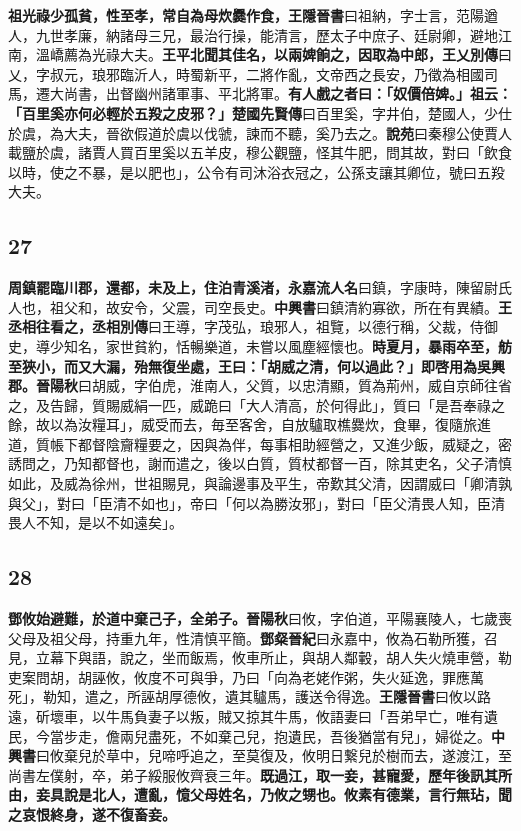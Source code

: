 \textbf{祖光祿少孤貧，性至孝，常自為母炊爨作食，}{\footnotesize \textbf{王隱晉書}曰祖納，字士言，范陽遒人，九世孝廉，納諸母三兄，最治行操，能清言，歷太子中庶子、廷尉卿，避地江南，溫嶠薦為光祿大夫。}\textbf{王平北聞其佳名，以兩婢餉之，因取為中郎，}{\footnotesize \textbf{王乂別傳}曰乂，字叔元，琅邪臨沂人，時蜀新平，二將作亂，文帝西之長安，乃徵為相國司馬，遷大尚書，出督幽州諸軍事、平北將軍。}\textbf{有人戲之者曰：「奴價倍婢。」祖云：「百里奚亦何必輕於五羖之皮邪？」}{\footnotesize \textbf{楚國先賢傳}曰百里奚，字井伯，楚國人，少仕於虞，為大夫，晉欲假道於虞以伐虢，諫而不聽，奚乃去之。\textbf{說苑}曰秦穆公使賈人載鹽於虞，諸賈人買百里奚以五羊皮，穆公觀鹽，怪其牛肥，問其故，對曰「飲食以時，使之不暴，是以肥也」，公令有司沐浴衣冠之，公孫支讓其卿位，號曰五羖大夫。}

\subsection*{27}

\textbf{周鎮罷臨川郡，還都，未及上，住泊青溪渚，}{\footnotesize \textbf{永嘉流人名}曰鎮，字康時，陳留尉氏人也，祖父和，故安令，父震，司空長史。\textbf{中興書}曰鎮清約寡欲，所在有異績。}\textbf{王丞相往看之，}{\footnotesize \textbf{丞相別傳}曰王導，字茂弘，琅邪人，祖覽，以德行稱，父裁，侍御史，導少知名，家世貧約，恬暢樂道，未嘗以風塵經懷也。}\textbf{時夏月，暴雨卒至，舫至狹小，而又大漏，殆無復坐處，王曰：「胡威之清，何以過此？」即啓用為吳興郡。}{\footnotesize \textbf{晉陽秋}曰胡威，字伯虎，淮南人，父質，以忠清顯，質為荊州，威自京師往省之，及告歸，質賜威絹一匹，威跪曰「大人清高，於何得此」，質曰「是吾奉祿之餘，故以為汝糧耳」，威受而去，毎至客舍，自放驢取樵爨炊，食畢，復隨旅進道，質帳下都督陰齎糧要之，因與為伴，每事相助經營之，又進少飯，威疑之，密誘問之，乃知都督也，謝而遣之，後以白質，質杖都督一百，除其吏名，父子清慎如此，及威為徐州，世祖賜見，與論邊事及平生，帝歎其父清，因謂威曰「卿清孰與父」，對曰「臣清不如也」，帝曰「何以為勝汝邪」，對曰「臣父清畏人知，臣清畏人不知，是以不如遠矣」。}

\subsection*{28}

\textbf{鄧攸始避難，於道中棄己子，全弟子。}{\footnotesize \textbf{晉陽秋}曰攸，字伯道，平陽襄陵人，七歲喪父母及祖父母，持重九年，性清慎平簡。\textbf{鄧粲晉紀}曰永嘉中，攸為石勒所獲，召見，立幕下與語，說之，坐而飯焉，攸車所止，與胡人鄰轂，胡人失火燒車營，勒吏案問胡，胡誣攸，攸度不可與爭，乃曰「向為老姥作粥，失火延逸，罪應萬死」，勒知，遣之，所誣胡厚德攸，遺其驢馬，護送令得逸。\textbf{王隱晉書}曰攸以路遠，斫壞車，以牛馬負妻子以叛，賊又掠其牛馬，攸語妻曰「吾弟早亡，唯有遺民，今當步走，儋兩兒盡死，不如棄己兒，抱遺民，吾後猶當有兒」，婦從之。\textbf{中興書}曰攸棄兒於草中，兒啼呼追之，至莫復及，攸明日繋兒於樹而去，遂渡江，至尚書左僕射，卒，弟子綏服攸齊衰三年。}\textbf{既過江，取一妾，甚寵愛，歷年後訊其所由，妾具說是北人，遭亂，憶父母姓名，乃攸之甥也。攸素有德業，言行無玷，聞之哀恨終身，遂不復畜妾。}

